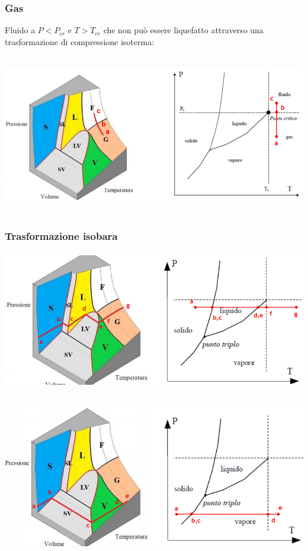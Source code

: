 \subsubsection{Gas}
Fluido a $P< P_{cr}$ e $T> T_{cr}$ che non può essere liquefatto attraverso una trasformazione di compressione isoterma:
\begin{center}
    \includegraphics[height=7cm]{../L04/img4.PNG}
\end{center}
\subsubsection{Trasformazione isobara}
\begin{center}
    \includegraphics[height=6cm]{../L04/img6.PNG}
\end{center}
\begin{center}
    \includegraphics[height=7cm]{../L04/img5.PNG}
\end{center}
